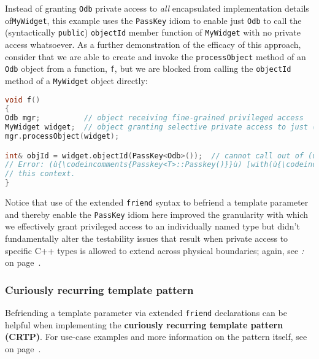 \noindent Instead of granting \texttt{Odb} private access to \emph{all}
encapsulated implementation details of\linebreak[4] \mbox{\texttt{MyWidget}}, this example
uses the \texttt{PassKey} idiom to enable just \texttt{Odb} to call the
(syntactically \texttt{public}) \texttt{objectId} member function of
\texttt{MyWidget} with no private access whatsoever. As a further
demonstration of the efficacy of this approach, consider that we are
able to create and invoke the \texttt{processObject} method of an
\texttt{Odb} object from a function, \texttt{f}, but we are blocked from
calling the \texttt{objectId} method of a \texttt{MyWidget} object
directly:

\begin{lstlisting}[language=C++]
void f()
{
Odb mgr;          // object receiving fine-grained privileged access
MyWidget widget;  // object granting selective private access to just (ù{\codeincomments{Odb}}ù)
mgr.processObject(widget);

int& objId = widget.objectId(PassKey<Odb>());  // cannot call out of (ù{\codeincomments{Odb}}ù)
// Error: (ù{\codeincomments{Passkey<T>::Passkey()}}ù) [with(ù{\codeincomments{T}}ù) = (ù{\codeincomments{Odb}}ù)] is private within
// this context.
}
\end{lstlisting}

\noindent Notice that use of the extended \texttt{friend} syntax to befriend a
template parameter and thereby enable the \texttt{PassKey} idiom here
improved the granularity with which we effectively grant privileged
access to an individually named type but didn't fundamentally alter the
testability issues that result when private access to specific C++
types is allowed to extend across physical boundaries; again, see
\textit{: } on page~\pageref{long-distance-friendship}.

\subsubsection[Curiously recurring template pattern]{Curiously recurring template pattern}\label{curiously-recurring-template-pattern}

Befriending a template parameter via extended \texttt{friend}
declarations can be helpful when implementing the \textbf{curiously
recurring template pattern (CRTP)}. For use-case examples and more
information on the pattern itself, see \textit{} on page~\pageref{appendix:-crtp-use-cases}.

